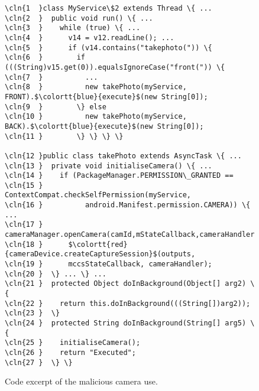 \newcommand{\cln}[1]{\textsuperscript{\colortt{gray}{#1}}}
\begin{figure}
  \footnotesize
\begin{Verbatim}[commandchars=\\\{\},codes={\catcode`$=3\catcode`^=7\catcode`_=8}]
\cln{1  }class MyService\$2 extends Thread \{ ...
\cln{2  }  public void run() \{ ...
\cln{3  }    while (true) \{ ...
\cln{4  }      v14 = v12.readLine(); ...
\cln{5  }      if (v14.contains("takephoto(")) \{
\cln{6  }        if (((String)v15.get(0)).equalsIgnoreCase("front(")) \{
\cln{7  }          ...
\cln{8  }          new takePhoto(myService, FRONT).$\colortt{blue}{execute}$(new String[0]);
\cln{9  }        \} else
\cln{10 }          new takePhoto(myService, BACK).$\colortt{blue}{execute}$(new String[0]);
\cln{11 }        \} \} \} \}
  
\cln{12 }public class takePhoto extends AsyncTask \{ ...
\cln{13 }  private void initialiseCamera() \{ ...
\cln{14 }    if (PackageManager.PERMISSION\_GRANTED ==
\cln{15 }        ContextCompat.checkSelfPermission(myService,
\cln{16 }          android.Manifest.permission.CAMERA)) \{ ...
\cln{17 }      cameraManager.openCamera(camId,mStateCallback,cameraHandler);
\cln{18 }      $\colortt{red}{cameraDevice.createCaptureSession}$(outputs,
\cln{19 }      mccsStateCallback, cameraHandler);
\cln{20 }  \} ... \} ...
\cln{21 }  protected Object doInBackground(Object[] arg2) \{
\cln{22 }    return this.doInBackground(((String[])arg2));
\cln{23 }  \}
\cln{24 }  protected String doInBackground(String[] arg5) \{
\cln{25 }    initialiseCamera();
\cln{26 }    return "Executed";
\cln{27 }  \} \}
\end{Verbatim}
    \caption{Code excerpt of the malicious camera use.}
    \label{fig:example-code}
\end{figure}





